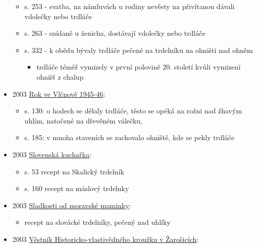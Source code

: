 \begin{itemize}
  \begin{itemize}
  \tightlist
  \item
    s. 253 - svatba, na námluvách u rodiny nevěsty na přivítanou dávali
    vdolečky nebo trdláče
  \item
    s. 263 - snídaně u ženicha, dostávají vdolečky nebo trdláče
  \item
    s. 332 - k obědu bývaly trdláče pečené na trdelníku na ohništi nad
    ohněm

    \begin{itemize}
    \tightlist
    \item
      trdláče téměř vymizely v první polovině 20. století kvůli vymizení
      ohnišť z chalup
    \end{itemize}
  \end{itemize}
\item
  2003
  \href{https://ceskadigitalniknihovna.cz/uuid/uuid:72938430-ef5f-11e5-bdc9-005056827e52}{Rok
  ve Vlčnově 1945-46}:

  \begin{itemize}
  \tightlist
  \item
    s. 130: o hodech se dělaly trdláče, těsto se opéká na rožni nad
    žhavým uhlím, natočené na dřevěném válečku,
  \item
    s. 185: v mnoha staveních se zachovalo ohniště, kde se pekly trdláče
  \end{itemize}
\item
  2003
  \href{https://ceskadigitalniknihovna.cz/view/uuid:b004cc10-6352-11e4-b42a-005056827e52?page=uuid\%3A70d8a160-6799-11e4-8fe2-5ef3fc9bb22f&fulltext=trdeln\%C3\%ADk\%20OR\%20trdeln\%C3\%ADky\%20OR\%20trdeln\%C3\%ADk\%C5\%AF&source=mzk}{Slovenská
  kuchařka}:

  \begin{itemize}
  \tightlist
  \item
    s. 53 recept na Skalický trdelník
  \item
    s. 160 recept na máslový trdelnky
  \end{itemize}
\item
  2003
  \href{https://ceskadigitalniknihovna.cz/view/uuid:cdea10f0-f64a-11e5-8d5f-005056827e51?page=uuid\%3A866b8a90-2194-11e6-8145-5ef3fc9bb22f&fulltext=trdeln\%C3\%ADk\%20OR\%20trdeln\%C3\%ADky\%20OR\%20trdeln\%C3\%ADk\%C5\%AF&source=mzk}{Sladkosti
  od moravské maminky}:

  \begin{itemize}
  \tightlist
  \item
    recept na slovácké trdelníky, pečený nad uhlíky
  \end{itemize}
\item
  2003
  \href{https://ceskadigitalniknihovna.cz/uuid/uuid:d6ed8ce0-451c-11e3-9c86-005056827e51}{Věstník
  Historicko-vlastivědného kroužku v Žarošicích}:


\end{itemize}

